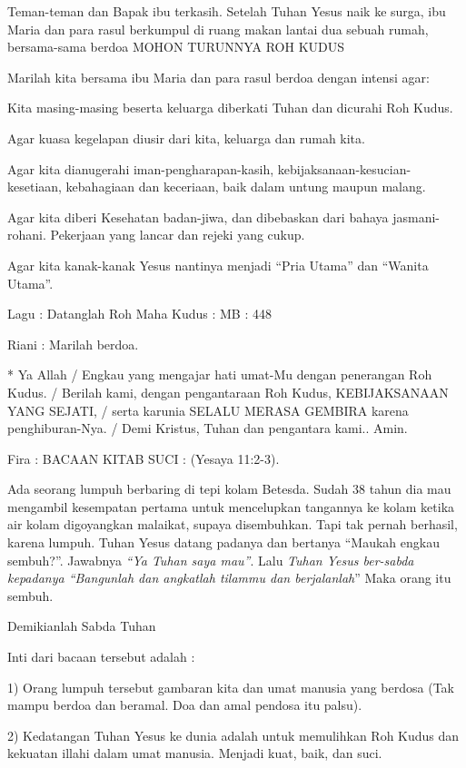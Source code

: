 \documentclass[12pt]{article}
\begin{document}
Teman-teman dan Bapak ibu terkasih. Setelah Tuhan Yesus naik ke surga,
ibu Maria dan para rasul berkumpul di ruang makan lantai dua sebuah
rumah, bersama-sama berdoa MOHON TURUNNYA ROH KUDUS 

Marilah kita bersama ibu Maria dan para rasul berdoa dengan intensi
agar: 

Kita masing-masing beserta keluarga diberkati Tuhan dan dicurahi Roh
Kudus. 

Agar kuasa kegelapan diusir dari kita, keluarga dan rumah kita. 

Agar kita dianugerahi iman-pengharapan-kasih,
kebijaksanaan-kesucian-kesetiaan, kebahagiaan dan keceriaan, baik dalam
untung maupun malang. 

Agar kita diberi Kesehatan badan-jiwa, dan dibebaskan dari bahaya
jasmani-rohani. Pekerjaan yang lancar dan rejeki yang cukup. 

Agar kita kanak-kanak Yesus nantinya menjadi {\textquotedblleft}Pria
Utama{\textquotedblright} dan {\textquotedblleft}Wanita
Utama{\textquotedblright}. 

Lagu : Datanglah Roh Maha Kudus : MB : 448

Riani : Marilah berdoa. 

* Ya Allah / Engkau yang mengajar hati umat-Mu dengan penerangan Roh
Kudus. / Berilah kami, dengan pengantaraan Roh Kudus, KEBIJAKSANAAN
YANG SEJATI, / serta karunia SELALU MERASA GEMBIRA karena
penghiburan-Nya. / Demi Kristus, Tuhan dan pengantara kami.. Amin.

Fira : BACAAN KITAB SUCI : (Yesaya 11:2{}-3).

Ada seorang lumpuh berbaring di tepi kolam Betesda. Sudah 38 tahun dia
mau mengambil kesempatan pertama untuk mencelupkan tangannya ke kolam
ketika air kolam digoyangkan malaikat, supaya disembuhkan. Tapi tak
pernah berhasil, karena lumpuh. Tuhan Yesus datang padanya dan bertanya
{\textquotedblleft}Maukah engkau sembuh?{\textquotedblright}. Jawabnya
\emph{{\textquotedblleft}Ya Tuhan saya mau{\textquotedblright}}. Lalu
\emph{Tuhan Yesus ber-sabda kepadanya {\textquotedblleft}Bangunlah dan
angkatlah tilammu dan berjalanlah}{\textquotedblright} Maka orang itu
sembuh.

Demikianlah Sabda Tuhan

Inti dari bacaan tersebut adalah :

 1) Orang lumpuh tersebut gambaran kita dan umat manusia yang berdosa
(Tak mampu berdoa dan beramal. Doa dan amal pendosa itu palsu). 

2) Kedatangan Tuhan Yesus ke dunia adalah untuk memulihkan Roh Kudus dan
kekuatan illahi dalam umat manusia. Menjadi kuat, baik, dan suci.
\end{document}
